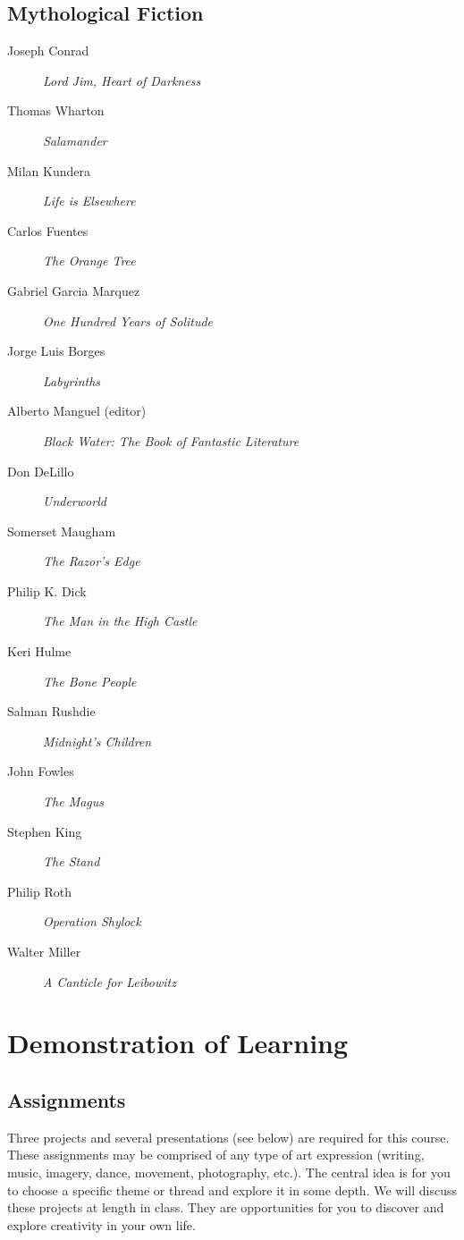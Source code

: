 \documentclass[letterpaper,10pt,headsepline]{scrreprt}
\begin{document}
\subsection{Mythological Fiction}
\begin{description}
\item [Joseph Conrad] \textit{Lord Jim, Heart of Darkness\/}
\item [Thomas Wharton] \textit{Salamander\/}
\item [Milan Kundera] \textit{Life is Elsewhere\/}
\item [Carlos Fuentes] \textit{The Orange Tree\/}
\item [Gabriel Garcia Marquez] \textit{One Hundred Years of Solitude\/}
\item [Jorge Luis Borges] \textit{Labyrinths\/}
\item [Alberto Manguel (editor)] \textit{Black Water: The Book of
    Fantastic Literature\/}
\item [Don DeLillo] \textit{Underworld\/}
\item [Somerset Maugham] \textit{The Razor's Edge\/}
\item [Philip K. Dick] \textit{The Man in the High Castle\/}
\item [Keri Hulme] \textit{The Bone People\/}
\item [Salman Rushdie] \textit{Midnight's Children\/}
\item [John Fowles] \textit{The Magus\/}
\item [Stephen King] \textit{The Stand\/}
\item [Philip Roth] \textit{Operation Shylock\/}
\item [Walter Miller] \textit{A Canticle for Leibowitz\/}
\end{description}

\clearpage

\section{Demonstration of Learning}

\subsection{Assignments}
Three projects and several presentations (see below) are required for this course. These assignments may be comprised of any type of art expression (writing, music, imagery, dance, movement, photography, etc.). The central idea is for you to choose a specific theme or thread and explore it in some depth. We will discuss these projects at length in class. They are opportunities for you to discover and explore creativity in your own life.
\end{document}
